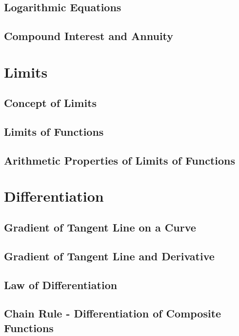 \documentclass{report}
\begin{document}
\begin{multicols}{2}
  \section{Logarithmic Equations}

  \section{Compound Interest and Annuity}

  \chapter{Limits}

  \section{Concept of Limits}

  \section{Limits of Functions}

  \section{Arithmetic Properties of Limits of Functions}

  \chapter{Differentiation}

  \section{Gradient of Tangent Line on a Curve}

  \section{Gradient of Tangent Line and Derivative}

  \section{Law of Differentiation}

  \section{Chain Rule - Differentiation of Composite Functions}


\end{multicols}
\end{document}
